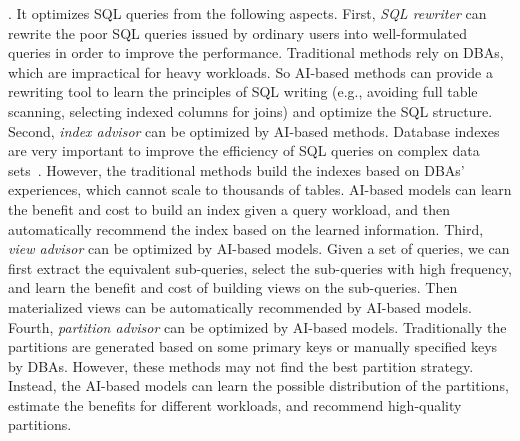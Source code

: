. It optimizes SQL queries from the following aspects. First, {\it SQL rewriter} can rewrite the poor SQL queries issued by ordinary users into well-formulated queries in order to improve the performance. Traditional methods rely on DBAs, which are impractical for heavy workloads. So AI-based methods can provide a rewriting tool to learn the principles of SQL writing (e.g., avoiding full table scanning, selecting indexed columns for joins) and optimize the SQL structure. Second, {\it index advisor} can be optimized by AI-based methods. Database indexes are very important to improve the efficiency of SQL queries on complex data sets~\cite{DBLP:journals/kais/GaniSSH16}. However, the traditional methods build the indexes based on DBAs' experiences, which cannot scale to thousands of tables. AI-based models can learn the benefit and cost to build an index given a query workload, and then automatically recommend the index based on the learned information. Third, \textit{view advisor} can be optimized by AI-based models. Given a set of queries, we can first extract the equivalent sub-queries, select the sub-queries with high frequency, and learn the benefit and cost of building views on the sub-queries. Then materialized views can be automatically recommended by AI-based models. Fourth, {\it partition advisor} can be optimized by AI-based models. Traditionally the partitions are generated based on some primary keys or manually specified keys by DBAs. However, these methods may not find the best partition strategy. Instead, the AI-based models can learn the possible distribution of the partitions, estimate the benefits for different workloads, and recommend high-quality partitions.
 

